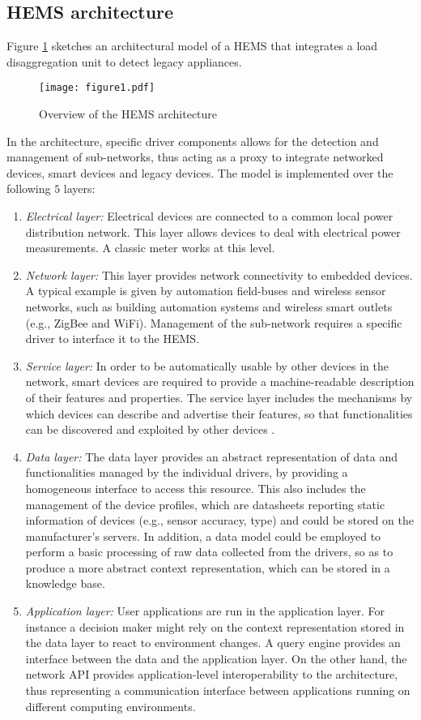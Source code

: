 \documentclass{article}
\begin{document}
\subsection{\ac{HEMS} architecture}\label{sec:architecture}
Figure \ref{fig:HEMSOverview} sketches an architectural model of a \ac{HEMS} that integrates a load disaggregation unit to detect legacy appliances.
\begin{figure}[h!]
\centering
\texttt{[image: figure1.pdf]}
\caption{Overview of the \ac{HEMS} architecture}
\label{fig:HEMSOverview}
\end{figure}
In the architecture, specific driver components allows for the detection and management of sub-networks, thus acting as a proxy to integrate networked devices, smart devices and legacy devices.
The model is implemented over the following $5$ layers:
\begin{enumerate}
  \item \textit{Electrical layer:}
  Electrical devices are connected to a common local power distribution network.
  This layer allows devices to deal with electrical power measurements.
  A classic meter works at this level.
   \item \textit{Network layer:}
  This layer provides network connectivity to embedded devices.
  A typical example is given by automation field-buses and wireless sensor networks, such as building automation systems and wireless smart outlets (e.g., ZigBee and WiFi).
  Management of the sub-network requires a specific driver to interface it to the \ac{HEMS}.
  \item \textit{Service layer:}
  In order to be automatically usable by other devices in the network, smart devices are required to provide a machine-readable description of their features and properties.
  The service layer includes the mechanisms by which devices can describe and advertise their features, so that functionalities can be discovered and exploited by other devices \cite{Jammes2005}.
\item \textit{Data layer:}
  The data layer provides an abstract representation of data and functionalities managed by the individual drivers, by providing a homogeneous interface to access this resource.
  This also includes the management of the device profiles, which are datasheets reporting static information of devices (e.g., sensor accuracy, type) and could be stored on the manufacturer's servers.
  In addition, a data model could be employed to perform a basic processing of raw data collected from the drivers, so as to produce a more abstract context representation, which can be stored in a knowledge base.
\item \textit{Application layer:}
  User applications are run in the application layer. For instance a decision maker might rely on the context representation stored in the data layer to react to environment changes.
  A query engine provides an interface between the data and the application layer.
  On the other hand, the network API provides application-level interoperability to the architecture, thus representing a communication interface between applications running on different computing environments.
\end{enumerate}
\end{document}
